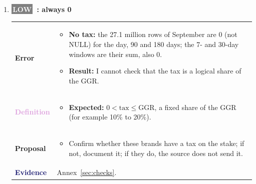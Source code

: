 \documentclass[11pt,a4paper]{article}
\makeatletter
\DeclareRobustCommand{\code}[1]{\path{#1}}
\newcommand{\issue}[6]{%
  \needspace{8\baselineskip}\item\label{#1}\textbf{#2}\par
  \begin{tabular}{@{}p{2.3cm}@{}p{\dimexpr\linewidth-2.3cm}@{}}
    \textcolor{BrickRed}{\textbf{Error}} & #3\\[2pt]
    \if\relax\detokenize{#4}\relax\else\textcolor{Plum}{\textbf{Definition}} & #4\\[2pt]\fi
    \textcolor{ForestGreen!70!black}{\textbf{Proposal}} & #5\\[2pt]
    \textcolor{MidnightBlue}{\textbf{Evidence}} & #6
  \end{tabular}\par\vspace{5pt}}
\newcommand{\pts}[1]{\begin{minipage}[t]{\linewidth}\vspace{-0.42\baselineskip}\begin{itemize}[nosep,leftmargin=1.1em,label=\textbullet,topsep=0pt,partopsep=0pt]#1\end{itemize}\strut\end{minipage}}
\newcommand{\badge}[2]{\colorbox{#1}{\textcolor{white}{\scriptsize\textbf{\,#2\,}}}}
\newcommand{\prioB}{\badge{gray}{LOW}}
\makeatother
\begin{document}
\begin{enumerate}[resume*=issues]
\issue{it:tax}{\prioB\ \code{tax_eur_*}: always 0}
{\pts{\item \textbf{No tax:} the 27.1 million rows of September are 0 (not NULL) for the day, 90 and 180 days; the 7- and 30-day windows are their sum, also 0.
\item \textbf{Result:} I cannot check that the tax is a logical share of the GGR.}}
{\pts{\item \textbf{Expected:} $0 < \text{tax} \le \text{GGR}$, a fixed share of the GGR (for example 10\% to 20\%).}}
{\pts{\item Confirm whether these brands have a tax on the stake; if not, document it; if they do, the source does not send it.}}
{Annex~\ref{sec:checks}.}

\end{enumerate}
\end{document}

